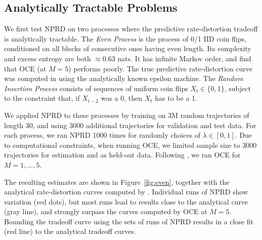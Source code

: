 \documentclass[11pt,letterpaper]{article}
\begin{document}
\subsection{Analytically Tractable Problems}\label{sec:tractable}

We first test NPRD on two processes where the predictive rate-distortion tradeoff is analytically tractable. %
The \emph{Even Process} \citep{marzen-predictive-2016} is the process of 0/1 IID coin flips, conditioned on all blocks of consecutive ones having even length.
Its complexity and excess entropy are both $\approx 0.63$ nats. %
It has infinite Markov order, and \cite{marzen-predictive-2016} find that OCE (at $M=5$) performs poorly. %
The true predictive rate-distortion curve was computed in \cite{marzen-predictive-2016} using the analytically known epsilon machine.
The \emph{Random Insertion Process} \citep{marzen-predictive-2016} consists of sequences of uniform coin flips $X_t \in \{0,1\}$, subject to the constraint that, if $X_{t-2}$ was a 0, then $X_{t}$ has to be a 1.



We applied NPRD to these processes by training on 3M random trajectories of length 30, and using 3000 additional trajectories for validation and test data.
For each process, we ran NPRD 1000 times for randomly choices of $\lambda \in [0,1]$.
Due to computational constraints, when running OCE, we limited sample size to 3000 trajectories for estimation and as held-out data.
Following \cite{marzen-predictive-2016}, we ran OCE for $M=1,...,5$.

The resulting estimates are shown in Figure~\ref{fig:even}, together with the analytical rate-distortion curves computed by \cite{marzen-predictive-2016}.
Individual runs of NPRD show variation (red dots), but most runs lead to results close to the analytical curve (gray line), and strongly surpass the curves computed by OCE at $M=5$.
Bounding the tradeoff curve using the sets of runs of NPRD results in a close fit (red line) to the analytical tradeoff curves.
\end{document}
